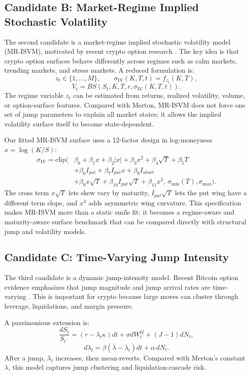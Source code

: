 \documentclass[11pt]{article}
\begin{document}
\subsection{Candidate B: Market-Regime Implied Stochastic Volatility}

The second candidate is a market-regime implied stochastic volatility model (MR-ISVM), motivated by recent crypto option research \cite{saef2022mrisvm}. The key idea is that crypto option surfaces behave differently across regimes such as calm markets, trending markets, and stress markets. A reduced formulation is:
\[
z_t\in\{1,\ldots,M\},\qquad
\sigma_{\mathrm{IV}}(K,T,t)=f_{z_t}(K,T),
\]
\[
V_t=BS\!\left(S_t,K,T,r,\sigma_{\mathrm{IV}}(K,T,t)\right).
\]
The regime variable $z_t$ can be estimated from returns, realized volatility, volume, or option-surface features. Compared with Merton, MR-ISVM does not force one set of jump parameters to explain all market states; it allows the implied volatility surface itself to become state-dependent.

Our fitted MR-ISVM surface uses a 12-factor design in log-moneyness $x=\log(K/S)$:
\[
\begin{aligned}
\sigma_{\mathrm{IV}}
=\mathrm{clip}\big(&
\beta_0+\beta_1x+\beta_2|x|+\beta_3x^2+\beta_4\sqrt{T}+\beta_5T\\
&+\beta_6I_{put}+\beta_7I_{put}x+\beta_8I_{short}\\
&+\beta_9x\sqrt{T}+\beta_{10}I_{put}\sqrt{T}+\beta_{11}x^3,\,
\sigma_{\min}(T),\sigma_{\max}\big).
\end{aligned}
\]
The cross term $x\sqrt{T}$ lets skew vary by maturity, $I_{put}\sqrt{T}$ lets the put wing have a different term slope, and $x^3$ adds asymmetric wing curvature. This specification makes MR-ISVM more than a static smile fit: it becomes a regime-aware and maturity-aware surface benchmark that can be compared directly with structural jump and volatility models.

\subsection{Candidate C: Time-Varying Jump Intensity}

The third candidate is a dynamic jump-intensity model. Recent Bitcoin option evidence emphasizes that jump magnitude and jump arrival rates are time-varying \cite{chenyang2024}. This is important for crypto because large moves can cluster through leverage, liquidations, and margin pressure.

A parsimonious extension is:
\[
\frac{dS_t}{S_{t^-}}=(r-\lambda_t\kappa)dt+\sigma dW_t^Q+(J-1)dN_t,
\]
\[
d\lambda_t=\beta(\bar{\lambda}-\lambda_t)dt+\alpha\,dN_t.
\]
After a jump, $\lambda_t$ increases, then mean-reverts. Compared with Merton's constant $\lambda$, this model captures jump clustering and liquidation-cascade risk.
\end{document}
